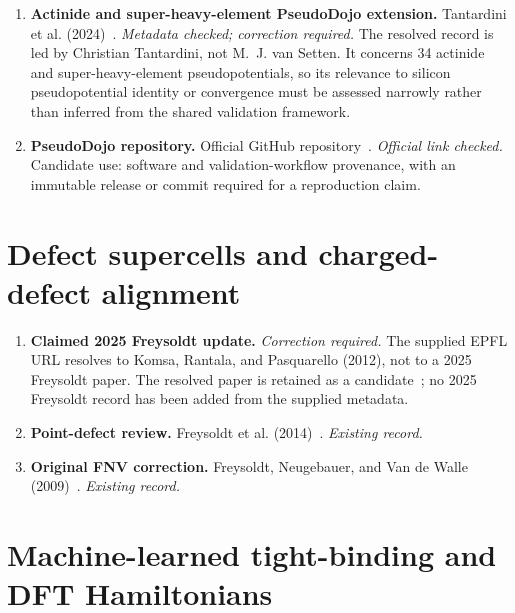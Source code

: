 \begin{enumerate}
  \item \textbf{Actinide and super-heavy-element PseudoDojo extension.}
    Tantardini et al. (2024)~\cite{tantardini2024}. \emph{Metadata checked;
    correction required.} The resolved record is led by Christian Tantardini,
    not M.~J. van Setten. It concerns 34 actinide and super-heavy-element
    pseudopotentials, so its relevance to silicon pseudopotential identity or
    convergence must be assessed narrowly rather than inferred from the shared
    validation framework.

  \item \textbf{PseudoDojo repository.}
    Official GitHub repository~\cite{pseudodojoRepository}. \emph{Official link
    checked.} Candidate use: software and validation-workflow provenance, with
    an immutable release or commit required for a reproduction claim.
\end{enumerate}

\section{Defect supercells and charged-defect alignment}

\begin{enumerate}
  \item \textbf{Claimed 2025 Freysoldt update.}
    \emph{Correction required.} The supplied EPFL URL resolves to Komsa,
    Rantala, and Pasquarello (2012), not to a 2025 Freysoldt paper. The resolved
    paper is retained as a candidate~\cite{komsa2012}; no 2025 Freysoldt record
    has been added from the supplied metadata.

  \item \textbf{Point-defect review.}
    Freysoldt et al. (2014)~\cite{freysoldt2014}. \emph{Existing record.}

  \item \textbf{Original FNV correction.}
    Freysoldt, Neugebauer, and Van de Walle (2009)~\cite{freysoldt2009}.
    \emph{Existing record.}
\end{enumerate}

\section{Machine-learned tight-binding and DFT Hamiltonians}

